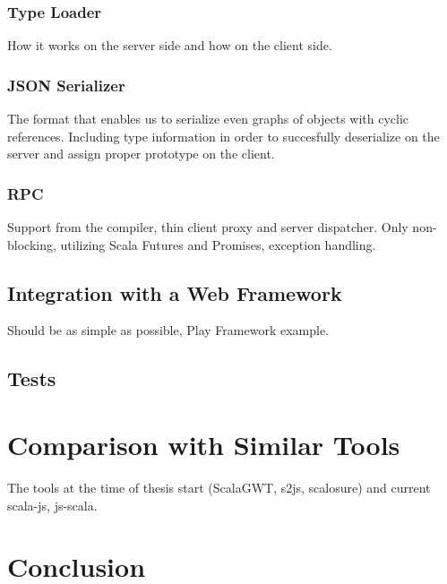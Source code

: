 \documentclass[12pt,a4paper]{report}
\begin{document}
\subsection{Type Loader}

How it works on the server side and how on the client side.

\subsection{JSON Serializer}

The format that enables us to serialize even graphs of objects with cyclic references. Including type information in order to succesfully deserialize on the server and assign proper prototype on the client.

\subsection{RPC}

Support from the compiler, thin client proxy and server dispatcher. Only non-blocking, utilizing Scala Futures and Promises, exception handling.

\section{Integration with a Web Framework}

Should be as simple as possible, Play Framework example.

\section{Tests}



\chapter{Comparison with Similar Tools}

The tools at the time of thesis start (ScalaGWT, s2js, scalosure) and current scala-js, js-scala.



\chapter{Conclusion}
\end{document}
